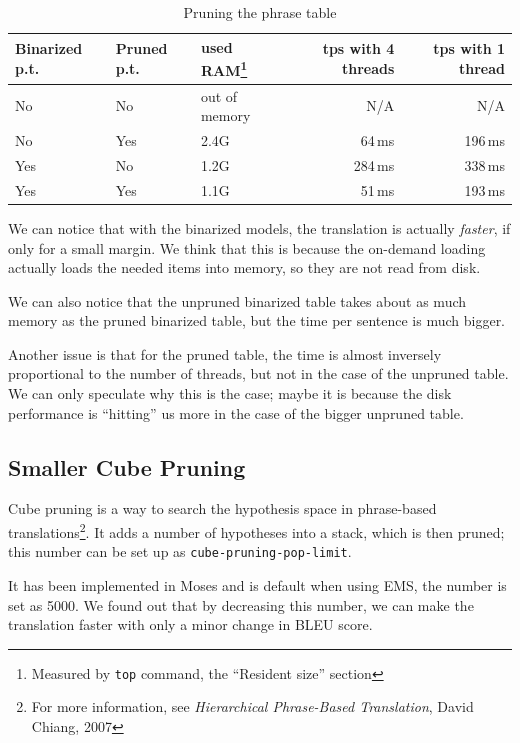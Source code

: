 \begin{table}[h]
\begin{center}
\begin{tabular}{|l|l|l|r|r|}
    \hline
    \textbf{Binarized p.t.} & \textbf{Pruned p.t.} & \textbf{used RAM}\footnote{Measured by \texttt{top} command, the ``Resident size'' section} & \textbf{tps with 4 threads} & \textbf{tps with 1 thread} \\ \hline
    No & No & out of memory & N/A&N/A \\ \hline
    No & Yes & 2.4G & 64\,ms& 196\,ms\\ \hline
    Yes & No & 1.2G & 284\,ms& 338\,ms\\ \hline
   
    Yes & Yes & 1.1G & 51\,ms& 193\,ms\\ \hline
    
\end{tabular}
\end{center}

\caption{Pruning the phrase table}\label{moses:binarizing}
\end{table}

We can notice that with the binarized models, the translation is actually \emph{faster}, if only for a small margin. We think that this is because the on-demand loading actually loads the needed items into memory, so they are not read from disk.

We can also notice that the unpruned binarized table takes about as much memory as the pruned binarized table, but the time per sentence is much bigger.

Another issue is that for the pruned table, the time is almost inversely proportional to the number of threads, but not in the case of the unpruned table. We can only speculate why this is the case; maybe it is because the disk performance is ``hitting'' us more in the case of the bigger unpruned table.

\subsection{Smaller Cube Pruning}
Cube pruning is a way to search the hypothesis space in phrase-based translations\footnote{For more information, see \emph{Hierarchical Phrase-Based Translation}, David Chiang, 2007}. It adds a number of  hypotheses into a stack, which is then pruned; this number can be set up as \texttt{cube-pruning-pop-limit}.

It has been implemented in Moses and is default when using EMS, the number is set as 5000. We found out that by decreasing this number, we can make the translation faster with only a minor change in BLEU score.

